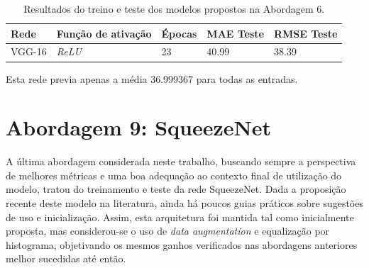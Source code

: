 \begin{table}[!ht]
\centering
\caption{Resultados do treino e teste dos modelos propostos na Abordagem 6.}
\label{tab:results-7}
 \begin{tabular}{l l l l l }
	 \toprule
	 Rede & Função de ativação & Épocas & MAE Teste & RMSE Teste \\
	 \midrule
	 VGG-16 & \emph{ReLU} & 23 & 40.99 & 38.39 \\
	 \bottomrule
 \end{tabular}
\end{table}
Esta rede previa apenas a média 36.999367 para todas as entradas.
%
%

\section{Abordagem 9: SqueezeNet}

	A última abordagem considerada neste trabalho, buscando sempre a perspectiva de melhores métricas e uma boa adequação ao contexto final de utilização do modelo, tratou do treinamento e teste da rede SqueezeNet. Dada a proposição recente deste modelo na literatura, ainda há poucos guias práticos sobre sugestões de uso e inicialização. Assim, esta arquitetura foi mantida tal como inicialmente proposta, mas considerou-se o uso de \emph{data augmentation} e equalização por histograma, objetivando os mesmos ganhos verificados nas abordagens anteriores melhor sucedidas até então.

